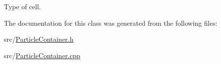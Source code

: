 Type of cell. 



The documentation for this class was generated from the following files\-:\begin{DoxyCompactItemize}
\item 
src/\hyperlink{ParticleContainer_8h}{Particle\-Container.\-h}\item 
src/\hyperlink{ParticleContainer_8cpp}{Particle\-Container.\-cpp}\end{DoxyCompactItemize}
